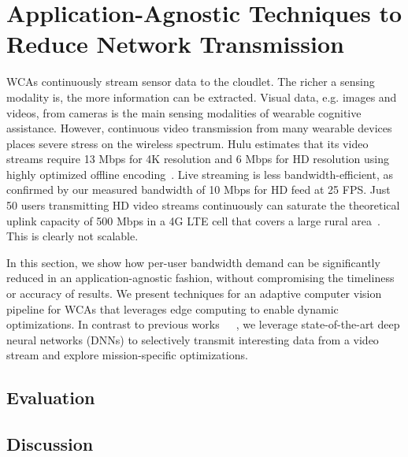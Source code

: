 \chapter{Application-Agnostic Techniques to Reduce Network Transmission}

WCAs continuously stream sensor data to the cloudlet. The richer a sensing
modality is, the more information can be extracted. Visual data, e.g. images and
videos, from cameras is the main sensing modalities of wearable cognitive
assistance. However, continuous video transmission from many wearable devices
places severe stress on the wireless spectrum.  Hulu estimates that its video
streams require 13 Mbps for 4K resolution and 6 Mbps for HD resolution using
highly optimized offline encoding~\cite{Hulu2017}. Live streaming is less
bandwidth-efficient, as confirmed by our measured bandwidth of 10 Mbps for HD
feed at 25 FPS. Just 50 users transmitting HD video streams continuously can
saturate the theoretical uplink capacity of 500 Mbps in a 4G LTE cell that
covers a large rural area~\cite{LteWorld2009}.  This is clearly not scalable.

In this section, we show how per-user bandwidth demand can be significantly
reduced in an application-agnostic fashion, without compromising the timeliness
or accuracy of results. We present techniques for an adaptive computer vision
pipeline for WCAs that leverages edge computing to enable dynamic optimizations.
In contrast to previous
works~\cite{Wang2017networked}~\cite{Zhang2015design}~\cite{Wang2016skyeyes}, we
leverage state-of-the-art deep neural networks (DNNs) to selectively transmit
interesting data from a video stream and explore mission-specific optimizations.





\section{Evaluation}
\section{Discussion}